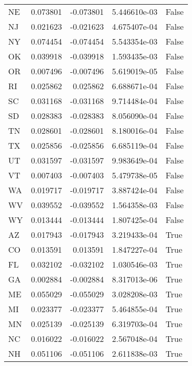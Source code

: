\begin{table}
\begin{tabular}{lrrrl}
      NE &   0.073801 & -0.073801 &   5.446610e-03 &         False \\
      NJ &   0.021623 & -0.021623 &   4.675407e-04 &         False \\
      NY &   0.074454 & -0.074454 &   5.543354e-03 &         False \\
      OK &   0.039918 & -0.039918 &   1.593435e-03 &         False \\
      OR &   0.007496 & -0.007496 &   5.619019e-05 &         False \\
      RI &   0.025862 &  0.025862 &   6.688671e-04 &         False \\
      SC &   0.031168 & -0.031168 &   9.714484e-04 &         False \\
      SD &   0.028383 & -0.028383 &   8.056090e-04 &         False \\
      TN &   0.028601 & -0.028601 &   8.180016e-04 &         False \\
      TX &   0.025856 & -0.025856 &   6.685119e-04 &         False \\
      UT &   0.031597 & -0.031597 &   9.983649e-04 &         False \\
      VT &   0.007403 & -0.007403 &   5.479738e-05 &         False \\
      WA &   0.019717 & -0.019717 &   3.887424e-04 &         False \\
      WV &   0.039552 & -0.039552 &   1.564358e-03 &         False \\
      WY &   0.013444 & -0.013444 &   1.807425e-04 &         False \\
      AZ &   0.017943 & -0.017943 &   3.219433e-04 &          True \\
      CO &   0.013591 &  0.013591 &   1.847227e-04 &          True \\
      FL &   0.032102 & -0.032102 &   1.030546e-03 &          True \\
      GA &   0.002884 & -0.002884 &   8.317013e-06 &          True \\
      ME &   0.055029 & -0.055029 &   3.028208e-03 &          True \\
      MI &   0.023377 & -0.023377 &   5.464855e-04 &          True \\
      MN &   0.025139 & -0.025139 &   6.319703e-04 &          True \\
      NC &   0.016022 & -0.016022 &   2.567048e-04 &          True \\
      NH &   0.051106 & -0.051106 &   2.611838e-03 &          True \\

\end{tabular}
\end{table}
